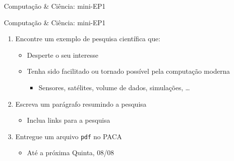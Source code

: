 \documentclass[10pt, compress, aspectratio=169, xcolor={table,usenames,dvipsnames}]{beamer}
\begin{document}
\begin{frame}[label={sec:org92feb23},fragile]{Computação \& Ciência: mini-EP1}
 \begin{block}{Computação \& Ciência: mini-EP1}
\begin{enumerate}
\item \alert{Encontre} um exemplo de \alert{pesquisa científica} que:
\begin{itemize}
\item Desperte o \alert{seu interesse}
\item Tenha sido \alert{facilitado} ou \alert{tornado possível} pela \alert{computação moderna}
\begin{itemize}
\item \alert{Sensores}, \alert{satélites}, \alert{volume de dados}, \alert{simulações}, \dots{}
\end{itemize}
\end{itemize}
\item \alert{Escreva um parágrafo} resumindo a pesquisa
\begin{itemize}
\item Inclua \alert{links} para a pesquisa
\end{itemize}
\item \alert{Entregue} um \alert{arquivo \texttt{pdf}} no \alert{PACA}
\begin{itemize}
\item Até a \alert{próxima Quinta, 08/08}
\end{itemize}
\end{enumerate}
\end{block}
\end{frame}
\maketitle
\end{document}
